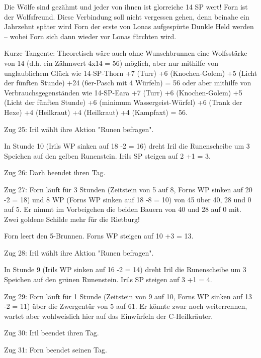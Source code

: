 \documentclass[10pt, a4paper, oneside]{book}
\begin{document}
{Die Wölfe sind gezähmt und jeder von ihnen ist glorreiche 14 SP wert! Forn ist der Wolfsfreund. Diese Verbindung soll nicht vergessen gehen, denn beinahe ein Jahrzehnt später wird Forn der erste von Lonas aufgespürte Dunkle Held werden – wobei Forn sich dann wieder vor Lonas fürchten wird.



Kurze Tangente: Theoretisch wäre auch ohne Wunschbrunnen eine Wolfsstärke von 14 (d.h. ein Zähmwert 4x14 = 56) möglich, aber nur mithilfe von unglaublichem Glück wie 14-SP-Thorn +7 (Turr) +6 (Knochen-Golem) +5 (Licht der fünften Stunde) +24 (6er-Pasch mit 4 Würfeln) = 56 oder aber mithilfe von Verbrauchsgegenständen wie 14-SP-Eara +7 (Turr) +6 (Knochen-Golem) +5 (Licht der fünften Stunde) +6 (minimum Wassergeist-Würfel) +6 (Trank der Hexe) +4 (Heilkraut) +4 (Heilkraut) +4 (Kampfaxt) = 56.



Zug 25: Iril wählt ihre Aktion "Runen befragen".

In Stunde 10 (Irils WP sinken auf 18 -2 = 16) dreht Iril die Runenscheibe um 3 Speichen auf den gelben Runenstein. Irils SP steigen auf 2 +1 = 3.



Zug 26: Darh beendet ihren Tag.



Zug 27: Forn läuft für 3 Stunden (Zeitstein von 5 auf 8, Forns WP sinken auf 20 -2 = 18) und 8 WP (Forns WP sinken auf 18 -8 = 10) von 45 über 40, 28 und 0 auf 5. Er nimmt im Vorbeigehen die beiden Bauern von 40 und 28 auf 0 mit. Zwei goldene Schilde mehr für die Rietburg!

Forn leert den 5-Brunnen. Forns WP steigen auf 10 +3 = 13.



Zug 28: Iril wählt ihre Aktion "Runen befragen".

In Stunde 9 (Irils WP sinken auf 16 -2 = 14) dreht Iril die Runenscheibe um 3 Speichen auf den grünen Runenstein. Irils SP steigen auf 3 +1 = 4.



Zug 29: Forn läuft für 1 Stunde (Zeitstein von 9 auf 10, Forns WP sinken auf 13 -2 = 11) über die Zwergentür von 5 auf 61. Er könnte zwar noch weiterrennen, wartet aber wohlweislich hier auf das Einwürfeln der C-Heilkräuter.



Zug 30: Iril beendet ihren Tag.



Zug 31: Forn beendet seinen Tag.\bigskip






}
\end{document}
